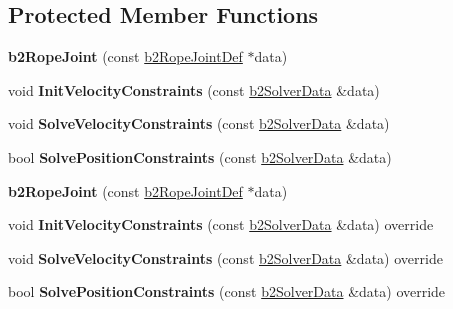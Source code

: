 \subsection*{Protected Member Functions}
\begin{DoxyCompactItemize}
\item 
\mbox{\label{classb2RopeJoint_a3f69f238616d8dc622d9448f81e14e53}} 
{\bfseries b2\+Rope\+Joint} (const \hyperlink{structb2RopeJointDef}{b2\+Rope\+Joint\+Def} $\ast$data)
\item 
\mbox{\label{classb2RopeJoint_a8146dad7f839f1285ab596661c3a84fa}} 
void {\bfseries Init\+Velocity\+Constraints} (const \hyperlink{structb2SolverData}{b2\+Solver\+Data} \&data)
\item 
\mbox{\label{classb2RopeJoint_ab3e9a866833f5ad079473ece272d3c88}} 
void {\bfseries Solve\+Velocity\+Constraints} (const \hyperlink{structb2SolverData}{b2\+Solver\+Data} \&data)
\item 
\mbox{\label{classb2RopeJoint_a50794029b91cd469b0598fe25a77948f}} 
bool {\bfseries Solve\+Position\+Constraints} (const \hyperlink{structb2SolverData}{b2\+Solver\+Data} \&data)
\item 
\mbox{\label{classb2RopeJoint_a3f69f238616d8dc622d9448f81e14e53}} 
{\bfseries b2\+Rope\+Joint} (const \hyperlink{structb2RopeJointDef}{b2\+Rope\+Joint\+Def} $\ast$data)
\item 
\mbox{\label{classb2RopeJoint_a8a9bd57a12aaf38b529ae626e714e1e8}} 
void {\bfseries Init\+Velocity\+Constraints} (const \hyperlink{structb2SolverData}{b2\+Solver\+Data} \&data) override
\item 
\mbox{\label{classb2RopeJoint_a08bf8f6cffe281a9f58ee469f99bf5b1}} 
void {\bfseries Solve\+Velocity\+Constraints} (const \hyperlink{structb2SolverData}{b2\+Solver\+Data} \&data) override
\item 
\mbox{\label{classb2RopeJoint_a2fcbda6d472c660aa01793c798a8f92e}} 
bool {\bfseries Solve\+Position\+Constraints} (const \hyperlink{structb2SolverData}{b2\+Solver\+Data} \&data) override
\end{DoxyCompactItemize}
